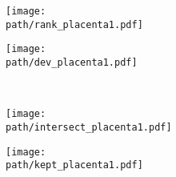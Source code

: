 \documentclass{article}
\begin{document}
\newcommand{\path}{../../real/pics-real}

\begin{figure}
    \begin{subfigure}{0.49\textwidth}
        \texttt{[image: \\path/rank\_placenta1.pdf]}
        \caption{}
    \end{subfigure}
    \begin{subfigure}{0.49\textwidth}
        \texttt{[image: \\path/dev\_placenta1.pdf]}
        \caption{}
    \end{subfigure}\\[0.1in]
    \begin{subfigure}[b]{0.49\textwidth}
        \texttt{[image: \\path/intersect\_placenta1.pdf]}
        \caption{}
    \end{subfigure}
    \begin{subfigure}[b]{0.49\textwidth}
        \texttt{[image: \\path/kept\_placenta1.pdf]}
        \caption{}
    \end{subfigure}
\end{figure}
\end{document}
